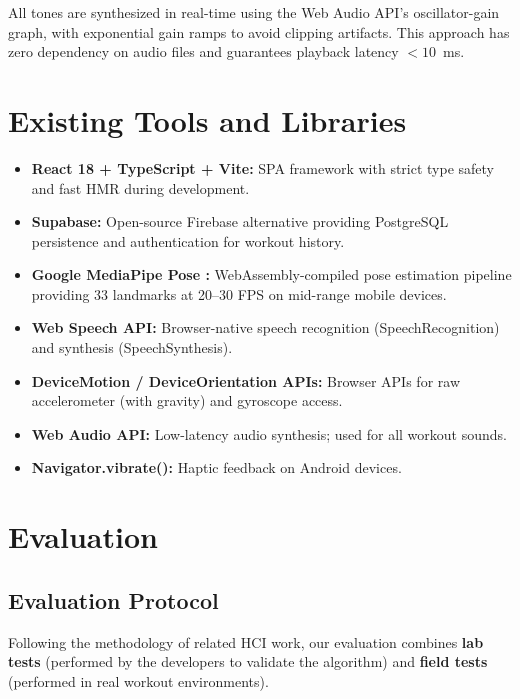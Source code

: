\documentclass[11pt]{article}
\begin{document}
All tones are synthesized in real-time using the Web Audio API's oscillator-gain graph, with exponential gain ramps to avoid clipping artifacts. This approach has zero dependency on audio files and guarantees playback latency $< 10$~ms.

\section{Existing Tools and Libraries}

\begin{itemize}
  \item \textbf{React 18 + TypeScript + Vite:} SPA framework with strict type safety and fast HMR during development.
  \item \textbf{Supabase:} Open-source Firebase alternative providing PostgreSQL persistence and authentication for workout history.
  \item \textbf{Google MediaPipe Pose \cite{mediapipe2020}:} WebAssembly-compiled pose estimation pipeline providing 33 landmarks at 20--30 FPS on mid-range mobile devices.
  \item \textbf{Web Speech API:} Browser-native speech recognition (SpeechRecognition) and synthesis (SpeechSynthesis).
  \item \textbf{DeviceMotion / DeviceOrientation APIs:} Browser APIs for raw accelerometer (with gravity) and gyroscope access.
  \item \textbf{Web Audio API:} Low-latency audio synthesis; used for all workout sounds.
  \item \textbf{Navigator.vibrate():} Haptic feedback on Android devices.
\end{itemize}

\section{Evaluation}

\subsection{Evaluation Protocol}

Following the methodology of related HCI work, our evaluation combines \textbf{lab tests} (performed by the developers to validate the algorithm) and \textbf{field tests} (performed in real workout environments).
\end{document}
